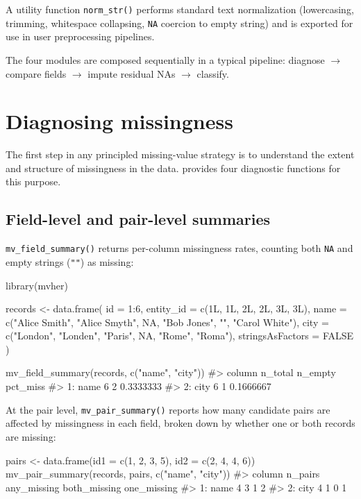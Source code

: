 \documentclass[a4paper]{article}
\begin{document}
\begin{article}
A utility function \texttt{norm\_str()} performs standard text
normalization (lowercasing, trimming, whitespace collapsing,
\texttt{NA} coercion to empty string) and is exported for use in user
preprocessing pipelines.

The four modules are composed sequentially in a typical pipeline:
diagnose $\to$ compare fields $\to$ impute residual NAs $\to$ classify.

\section{Diagnosing missingness}
\label{sec:diag}

The first step in any principled missing-value strategy is to understand
the extent and structure of missingness in the data. 
provides four diagnostic functions for this purpose.

\subsection{Field-level and pair-level summaries}

\texttt{mv\_field\_summary()} returns per-column missingness rates,
counting both \texttt{NA} and empty strings (\texttt{""}) as missing:

\begin{example}
library(mvher)

records <- data.frame(
  id        = 1:6,
  entity_id = c(1L, 1L, 2L, 2L, 3L, 3L),
  name      = c("Alice Smith", "Alice Smyth", NA,
                "Bob Jones", "", "Carol White"),
  city      = c("London", "Londen", "Paris", NA, "Rome", "Roma"),
  stringsAsFactors = FALSE
)

mv_field_summary(records, c("name", "city"))
#>    column n_total n_empty  pct_miss
#> 1:   name       6       2 0.3333333
#> 2:   city       6       1 0.1666667
\end{example}

At the pair level, \texttt{mv\_pair\_summary()} reports how many
candidate pairs are affected by missingness in each field, broken down
by whether one or both records are missing:

\begin{example}
pairs <- data.frame(id1 = c(1, 2, 3, 5), id2 = c(2, 4, 4, 6))
mv_pair_summary(records, pairs, c("name", "city"))
#>    column n_pairs any_missing both_missing one_missing
#> 1:   name       4           3            1           2
#> 2:   city       4           1            0           1
\end{example}


\end{article}
\end{document}
